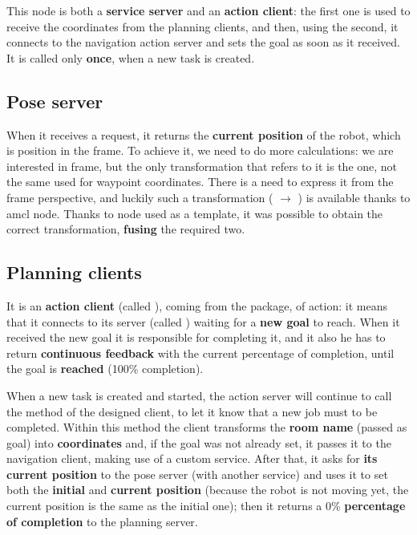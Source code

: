 This node is both a \textbf{service server} and an \textbf{action client}: the first one is used to receive the coordinates from the planning clients, and then, using the second, it connects to the navigation action server and sets the goal as soon as it received. It is called only \textbf{once}, when a new task is created.

\subsection{Pose server}
\label{sub:pose}

When it receives a request, it returns the \textbf{current position} of the robot, which is  position in the  frame. To achieve it, we need to do more calculations: we are interested in  frame, but the only transformation that refers to it is the  one, not the same used for waypoint coordinates. There is a need to express it from the  frame perspective, and luckily such a transformation ( $\rightarrow$ ) is available thanks to \acrshort{amcl} node. 
Thanks to  node\cite{tfexample} used as a template, it was possible to obtain the correct transformation, \textbf{fusing} the required two.

\subsection{Planning clients}

It is an \textbf{action client} (called ), coming from the  package, of  action: it means that it connects to its server (called ) waiting for a \textbf{new goal} to reach. When it received the new goal it is responsible for completing it, and it also he has to return \textbf{continuous feedback} with the current percentage of completion, until the goal is \textbf{reached} (100\% completion).

When a new task is created and started, the action server will continue to call the  method of the designed client, to let it know that a new job must to be completed.
Within this method the client transforms the \textbf{room name} (passed as goal) into \textbf{coordinates} and, if the goal was not already set, it passes it to the navigation client, making use of a custom service. After that, it asks for \textbf{its current position} to the pose server (with another service) and uses it to set both the \textbf{initial} and \textbf{current position} (because the robot is not moving yet, the current position is the same as the initial one); then it returns a  0\% \textbf{percentage of completion} to the planning server.

